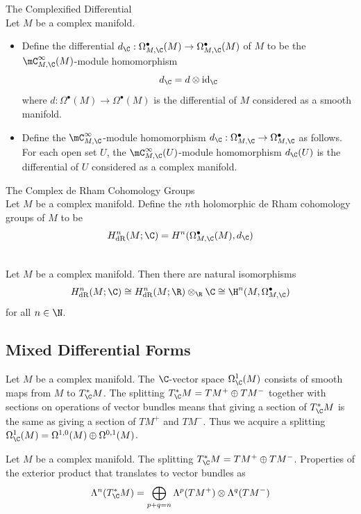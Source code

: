 \documentclass[a4paper]{article}
\begin{document}
\begin{defn}{The Complexified Differential}{}\\
Let $M$ be a complex manifold. 
\begin{itemize}
\item Define the differential $d_\C:\Omega_{M,\C}^\bullet(M)\to\Omega_{M,\C}^{\bullet}(M)$ of $M$ to be the $\mC_{M,\C}^\infty(M)$-module homomorphism $$d_\C=d\otimes\text{id}_\C$$ where $d:\Omega^{\bullet}(M)\to\Omega^{\bullet}(M)$ is the differential of $M$ considered as a smooth manifold. 
\item Define the $\mC_{M,\C}^\infty$-module homomorphism $d_\C:\Omega_{M,\C}^\bullet\to\Omega_{M,\C}^\bullet$ as follows. For each open set $U$, the $\mC_{M,\C}^\infty(U)$-module homomorphism $d_\C(U)$ is the differential of $U$ considered as a complex manifold. 
\end{itemize}
\end{defn}

\begin{defn}{The Complex de Rham Cohomology Groups}{}\\
Let $M$ be a complex manifold. Define the $n$th holomorphic de Rham cohomology groups of $M$ to be $$H_\text{dR}^n(M;\C)=H^n(\Omega_{M,\C}^\bullet(M),d_\C)$$
\end{defn}

\begin{prp}{}{}\\
Let $M$ be a complex manifold. Then there are natural isomorphisms $$H_\text{dR}^n(M;\C)\cong H_\text{dR}^n(M;\R)\otimes_\R\C\cong\H^n(M,\Omega_{M,\C}^\bullet)$$ for all $n\in\N$. 
\end{prp}

\subsection{Mixed Differential Forms}
Let $M$ be a complex manifold. The $\C$-vector space $\Omega_\C^1(M)$ consists of smooth maps from $M$ to $T_\C^\ast M$. The splitting $T_\C^\ast M=TM^+\oplus TM^-$ together with sections on operations of vector bundles means that giving a section of $T_\C^\ast M$ is the same as giving a section of $TM^+$ and $TM^-$. Thus we acquire a splitting $\Omega_\C^1(M)=\Omega^{1,0}(M)\oplus\Omega^{0,1}(M)$. 

Let $M$ be a complex manifold. The splitting $T_\C^\ast M=TM^+\oplus TM^-$. Properties of the exterior product that translates to vector bundles as $$\Lambda^n(T_\C^\ast M)=\bigoplus_{p+q=n}\Lambda^p(TM^+)\otimes\Lambda^q(TM^-)$$
\end{document}
